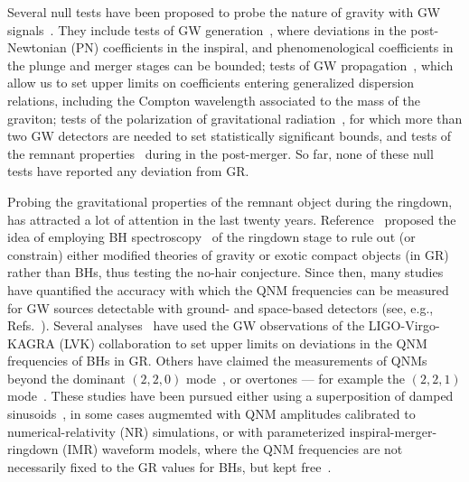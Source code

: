 \documentclass[twocolumn,
               prd,
               aps,
               superscriptaddress,
               tightenlines,
               nofootinbib,
               eqsecnum,
               amsfonts,
               amsmath,
               longbibliography]{revtex4-1}
\begin{document}
Several null tests have been proposed to probe the nature of gravity with GW signals~\cite{TheLIGOScientific:2016src,Yunes:2016jcc,Abbott:2018lct,LIGOScientific:2019fpa,Abbott:2020jks,LIGOScientific:2021sio}. They include tests of GW generation~\cite{Arun:2006yw,Yunes:2009ke,Li:2011cg,Agathos:2013upa,Mehta:2022pcn}, where deviations in the post-Newtonian (PN) coefficients in the inspiral, and phenomenological coefficients in the plunge and merger stages can be bounded; tests of GW propagation~\cite{Will:1997bb}, which allow us to set upper limits on coefficients entering generalized dispersion relations, including the Compton wavelength associated to the
mass of the graviton; tests of the polarization of gravitational radiation~\cite{Will:2014kxa}, for which more than
two GW detectors are needed to set statistically significant bounds, and tests of the remnant properties~\cite{Meidam:2014jpa,Carullo:2018sfu,Brito:2018rfr,Carullo:2019flw,Isi:2019aib,Ghosh:2021mrv,Carullo:2021dui}
during in the post-merger. So far, none of these null tests have reported any deviation from GR.

Probing the gravitational properties of the remnant object during the
ringdown, has attracted a lot of attention in the last twenty years.
Reference~\cite{Dreyer:2003bv} proposed the idea of employing BH spectroscopy~\cite{Detweiler:1980gk}
of the ringdown stage to rule out (or constrain) either modified theories of
gravity or exotic compact objects (in GR) rather than BHs, thus
testing the no-hair conjecture. Since then, many studies have quantified the accuracy
with which the QNM frequencies can be measured for
GW sources detectable with ground- and space-based detectors (see, e.g., Refs.~\cite{Berti:2005ys,Baibhav:2020tma,Bhagwat:2021kwv,Ota:2021ypb}). Several analyses~\cite{Carullo:2018sfu,
Brito:2018rfr,Carullo:2019flw,Isi:2019aib,Ghosh:2021mrv,Carullo:2021dui}
have used the GW observations of the LIGO-Virgo-KAGRA (LVK) collaboration to set upper
limits on deviations in the QNM frequencies of BHs in GR. Others have claimed
the measurements of QNMs beyond the dominant $(2,2,0)$ mode~\cite{Capano:2021etf},
or overtones --- for example the $(2,2,1)$ mode~\cite{Isi:2019aib,Cotesta:2022pci,Isi:2022mhy}.
%
These studies have been pursued either using a superposition
of damped sinusoids~\cite{Giesler:2019uxc,Carullo:2019flw}, in some cases augmemted with QNM amplitudes calibrated to
numerical-relativity (NR) simulations, or with parameterized inspiral-merger-ringdown (IMR)
waveform models, where the QNM frequencies are not necessarily fixed
to the GR values for BHs, but kept free~\cite{Brito:2018rfr,Ghosh:2021mrv}.
\end{document}

